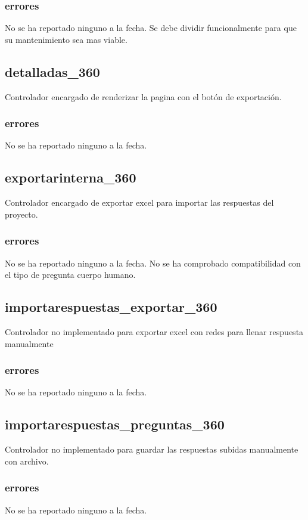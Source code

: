 \documentclass[10pt,a4paper]{book}
\begin{document}
	\subsubsection{errores}
	No se ha reportado ninguno a la fecha. Se debe dividir funcionalmente para que su mantenimiento sea mas viable.

	\subsection{detalladas\_360}
	Controlador encargado de renderizar la pagina con el botón de exportación.
	\subsubsection{errores}
	No se ha reportado ninguno a la fecha.

	\subsection{exportarinterna\_360}
	Controlador encargado de exportar excel para importar las respuestas del proyecto.
	\subsubsection{errores}
	No se ha reportado ninguno a la fecha. No se ha comprobado compatibilidad con el tipo de pregunta cuerpo humano.

	\subsection{importarespuestas\_exportar\_360}
	Controlador no implementado para exportar excel con redes para llenar respuesta manualmente
	\subsubsection{errores}
	No se ha reportado ninguno a la fecha.

	\subsection{importarespuestas\_preguntas\_360}
	Controlador no implementado para guardar las respuestas subidas manualmente con archivo.
	\subsubsection{errores}
	No se ha reportado ninguno a la fecha.
\end{document}
